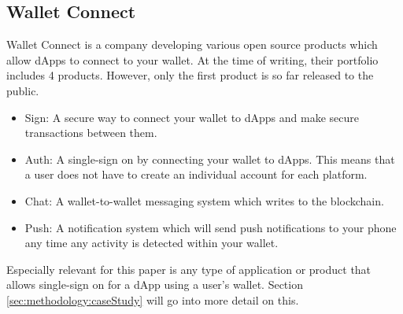 \subsection{Wallet Connect}
Wallet Connect \cite{walletConnect} is a company developing various open source products which allow dApps to connect to your wallet. At the time of writing, their portfolio includes 4 products. However, only the first product is so far released to the public.
\begin{itemize}
	\item Sign: A secure way to connect your wallet to dApps and make secure transactions between them. \cite{walletConnect}
	\item Auth: A single-sign on by connecting your wallet to dApps. This means that a user does not have to create an individual account for each platform. \cite{walletConnect}
	\item Chat: A wallet-to-wallet messaging system which writes to the blockchain. \cite{walletConnect}
	\item Push: A notification system which will send push notifications to your phone any time any activity is detected within your wallet. \cite{walletConnect}
\end{itemize}

Especially relevant for this paper is any type of application or product that allows single-sign on for a dApp using a user's wallet. Section \ref{sec:methodology:caseStudy} will go into more detail on this.

